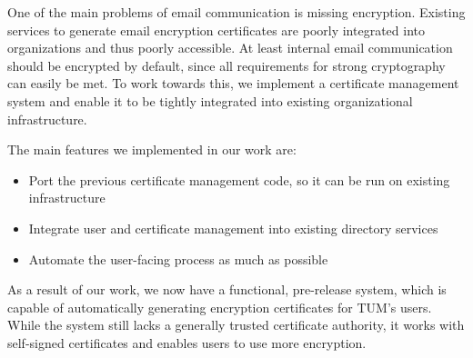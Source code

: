 \small

One of the main problems of email communication is missing encryption.
Existing services to generate email encryption certificates are poorly integrated into organizations and thus poorly
accessible.
At least internal email communication should be encrypted by default, since all requirements for strong cryptography can
easily be met.
To work towards this, we implement a certificate management system and enable it to be tightly integrated into existing
organizational infrastructure.

The main features we implemented in our work are:
\begin{itemize}
    \item Port the previous certificate management code, so it can be run on existing infrastructure
    \item Integrate user and certificate management into existing directory services
    \item Automate the user-facing process as much as possible
\end{itemize}

As a result of our work, we now have a functional, pre-release system, which is capable of automatically generating
encryption certificates for TUM's users.
While the system still lacks a generally trusted certificate authority, it works with self-signed certificates and
enables users to use more encryption.

